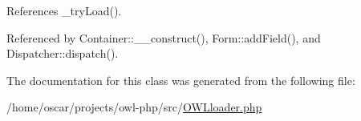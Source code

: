 References \_\-tryLoad().



Referenced by Container::\_\-\_\-construct(), Form::addField(), and Dispatcher::dispatch().



The documentation for this class was generated from the following file:\begin{DoxyCompactItemize}
\item 
/home/oscar/projects/owl-\/php/src/\hyperlink{OWLloader_8php}{OWLloader.php}\end{DoxyCompactItemize}
